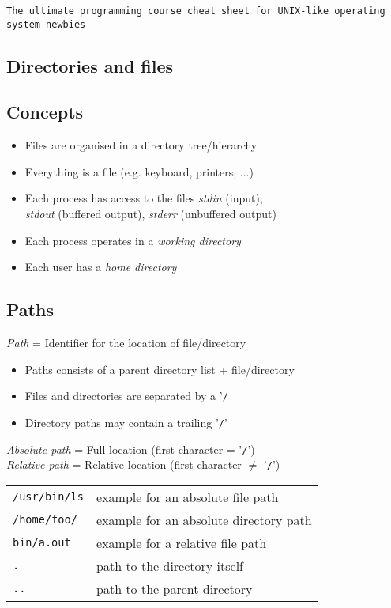 \documentclass[landscape, a4paper]{article}
\newcommand{\cl}[1]{\texttt{#1}}
\begin{document}
\begin{center}	\cl{The ultimate programming course cheat sheet for UNIX-like operating system newbies}
\end{center}
\begin{multicols*}{3}
\section*{\centering Directories and files}
\subsection*{Concepts}
\begin{itemize}
	\item Files are organised in a directory tree/hierarchy
	\item Everything is a file (e.g. keyboard, printers, ...)
	\item Each process has access to the files \textit{stdin} (input),\\
		  \textit{stdout} (buffered output), \textit{stderr} (unbuffered output)
	\item Each process operates in a \textit{working directory}
	\item Each user has a \textit{home directory}
\end{itemize}
\subsection*{Paths}
\textit{Path} = Identifier for the location of file/directory
\begin{itemize}
	\item Paths consists of a parent directory list + file/directory
	\item Files and directories are separated by a '\cl{/}
	\item Directory paths may contain a trailing '\cl{/}'
\end{itemize}
\textit{Absolute path} = Full location (first character = '\cl{/}')\\
\textit{Relative path} = Relative location (first character $\neq$ '\cl{/}')\\

\begin{tabular}{ll}
\cl{/usr/bin/ls}	& example for an absolute file path\\
\cl{/home/foo/} 	& example for an absolute directory path\\
\cl{bin/a.out} 		& example for a relative file path\\
\cl{.} 				& path to the directory itself\\
\cl{..} 			& path to the parent directory\\
\end{tabular}

\end{multicols*}
\end{document}

